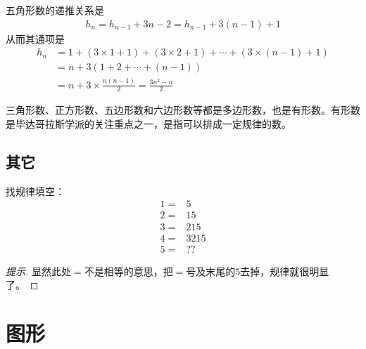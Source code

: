 五角形数的递推关系是
\begin{align*}
  h_n = h_{n-1} + 3n - 2 = h_{n-1} + 3(n-1) + 1
\end{align*}
从而其通项是
\begin{align*}
  h_n & = 1 + (3\times 1 + 1) + (3\times 2 + 1) + \cdots + (3\times (n-1) + 1) \\
      & = n + 3\left(1 + 2 + \cdots + (n-1)\right)\\
      & = n + 3\times\frac{n(n-1)}{2} = \frac{3n^2-n}{2}
\end{align*}

三角形数、正方形数、五边形数和六边形数等都是{\kai 多边形数}，也是{\kai 有形数}。有形数是毕达哥拉斯学派的关注重点之一，是指可以排成一定规律的数。

\subsection{其它}
\label{sec:misc-series}

\begin{example}
  找规律填空：
  \begin{align*}
    1=&5\\
    2=&15\\
    3=&215\\
    4=&3215\\
    5=&??
  \end{align*}
\end{example}
\begin{proof}[提示]
  显然此处$=$不是相等的意思，把$=$号及末尾的$5$去掉，规律就很明显了。
\end{proof}
  
\section{图形}
\label{sec:graph-pattern}

